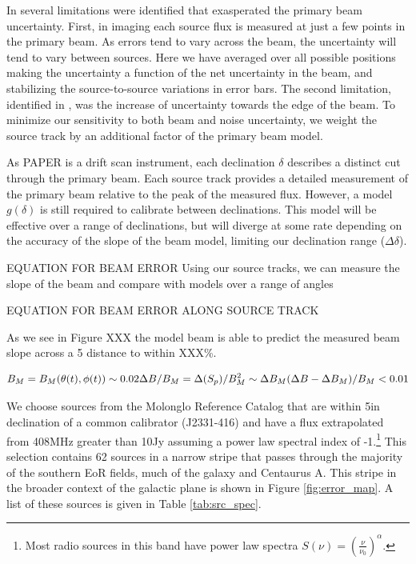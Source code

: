 \documentclass[preprint]{aastex}
\begin{document}
 In \citet{Jacobs:2013p9837} several limitations were identified that
exasperated the primary beam uncertainty.  First, in imaging each source flux is measured at just a few 
points in the primary beam. As errors tend to vary across the beam, the uncertainty will tend to vary between sources.
Here we have averaged over all possible positions making the uncertainty a function of the net uncertainty in the beam,
and stabilizing the source-to-source variations in error bars. The second limitation, identified in \citet{Williams:2012p8768},
was the increase of uncertainty towards the edge of the beam. To minimize our sensitivity to both beam and noise
uncertainty, we weight the source track by an additional factor of the primary beam model.  


As PAPER is a drift scan instrument, each declination $\delta$ describes a distinct cut through the primary beam. Each source track
provides a detailed measurement of the primary beam relative to the peak of the measured flux. However,
a model $g(\delta)$ is still required to calibrate between declinations. This model will be effective over a range of declinations, but will diverge at
some rate depending on the accuracy of the slope of the beam model, limiting our declination range ($\Delta \delta$).  


EQUATION FOR BEAM ERROR %
Using our source tracks, we can measure the slope of the beam and compare with models over a range of angles

EQUATION FOR BEAM ERROR ALONG SOURCE TRACK %


As we see in Figure XXX the model beam is able to predict the measured beam slope across a 5\arcdeg
distance to within XXX\%.





\[
B_M = B_M(\theta(t),\phi(t))\\
\sim 0.02\\
\Delta B /B_M= \Delta (S_p)/B^2_M \sim \Delta B_M \\
(\Delta B - \Delta B_M)/B_M < 0.01
\]



We choose sources from the Molonglo
Reference Catalog \cite[MRC]{Large:1981p7798} that are within 5\arcdeg in
declination of a common calibrator (J2331-416) and have a flux extrapolated
from 408MHz greater than 10Jy assuming a power law spectral index of
-1.\footnote{Most radio sources in this band have power law spectra $S(\nu) =
\left(\frac{\nu}{\nu_0}\right)^\alpha$. } This selection contains 62 sources in a narrow
stripe that passes through the majority of the southern EoR fields, much of the
galaxy and Centaurus A. This stripe in the broader context of the galactic plane
is shown in Figure \ref{fig:error_map}.
A list of these 
sources is given in Table \ref{tab:src_spec}. 
\end{document}
